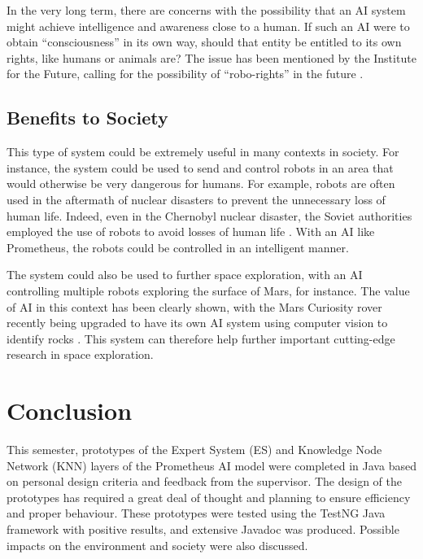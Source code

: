 \documentclass[titlepage,11pt]{article}
\begin{document}
In the very long term, there are concerns with the possibility that an AI system might achieve intelligence and awareness close to a human. If such an AI were to obtain ``consciousness'' in its own way, should that entity be entitled to its own rights, like humans or animals are? The issue has been mentioned by the Institute for the Future, calling for the possibility of ``robo-rights'' in the future \cite{robo_rights}.


\subsection{Benefits to Society}

This type of system could be extremely useful in many contexts in society. For instance, the system could be used to send and control robots in an area that would otherwise be very dangerous for humans. For example, robots are often used in the aftermath of nuclear disasters to prevent the unnecessary loss of human life. Indeed, even in the Chernobyl nuclear disaster, the Soviet authorities employed the use of robots to avoid losses of human life \cite{chernobyl}. With an AI like Prometheus, the robots could be controlled in an intelligent manner.

The system could also be used to further space exploration, with an AI controlling multiple robots exploring the surface of Mars, for instance. The value of AI in this context has been clearly shown, with the Mars Curiosity rover recently being upgraded to have its own AI system using computer vision to identify rocks \cite{rover}. This system can therefore help further important cutting-edge research in space exploration.

\section{Conclusion}

This semester, prototypes of the Expert System (ES) and Knowledge Node Network (KNN) layers of the Prometheus AI model were completed in Java based on personal design criteria and feedback from the supervisor. The design of the prototypes has required a great deal of thought and planning to ensure efficiency and proper behaviour. These prototypes were tested using the TestNG Java framework with positive results, and extensive Javadoc was produced. Possible impacts on the environment and society were also discussed.
\end{document}
